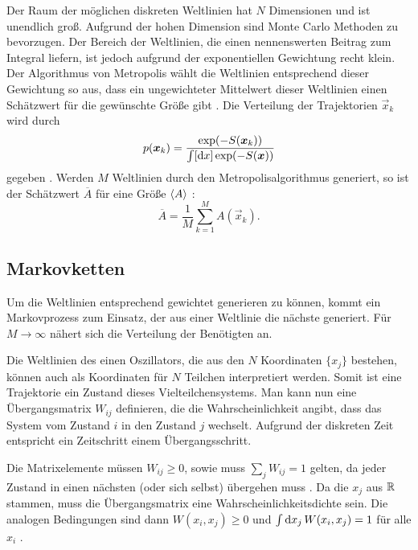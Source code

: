 Der Raum der möglichen diskreten Weltlinien hat $N$ Dimensionen und ist
unendlich groß. Aufgrund der hohen Dimension sind Monte Carlo Methoden zu
bevorzugen. Der Bereich der Weltlinien, die einen nennenswerten Beitrag zum
Integral liefern, ist jedoch aufgrund der exponentiellen Gewichtung recht
klein. Der Algorithmus von Metropolis wählt die Weltlinien entsprechend dieser
Gewichtung so aus, dass ein ungewichteter Mittelwert dieser Weltlinien einen
Schätzwert für die gewünschte Größe gibt
\parencite[434]{Creutz/Statistical_Approach_QM}. Die Verteilung der
Trajektorien $\vec x_k$ wird durch
\begin{equation}
    \label{eq:p_x_k}
    p(\vec x_k) = \frac{\exp(-S(\vec x_k))}{\int [\dif x] \exp(-S(\vec x))}
\end{equation}
gegeben \parencite[(3.6)]{Creutz/Statistical_Approach_QM}. Werden $M$
Weltlinien durch den Metropolisalgorithmus generiert, so ist der Schätzwert
$\overline A$ für
eine Größe $\langle A \rangle$
\parencite[(3.7)]{Creutz/Statistical_Approach_QM}:
\[
    \overline A = \frac1M \sum_{k=1}^M A(\vec x_k).
\]

\subsection{Markovketten}

Um die Weltlinien entsprechend gewichtet generieren zu können, kommt ein
Markovprozess zum Einsatz, der aus einer Weltlinie die nächste generiert. Für
$M \to \infty$ nähert sich die Verteilung der Benötigten an.
\parencite[434]{Creutz/Statistical_Approach_QM}


Die Weltlinien des einen Oszillators, die aus den $N$ Koordinaten $\{x_j\}$
bestehen, können auch als Koordinaten für $N$ Teilchen interpretiert werden.
Somit ist eine Trajektorie ein Zustand dieses Vielteilchensystems. Man kann nun
eine Übergangsmatrix $W_{ij}$ definieren, die die Wahrscheinlichkeit angibt,
dass das System vom Zustand $i$ in den Zustand $j$ wechselt. Aufgrund der
diskreten Zeit entspricht ein Zeitschritt einem Übergangsschritt.

Die Matrixelemente müssen $W_{ij} \geq 0$, sowie muss $\sum_j W_{ij} = 1$
gelten, da jeder Zustand in einen nächsten (oder sich selbst) übergehen muss
\parencite[(3.8)]{Creutz/Statistical_Approach_QM}. Da die $x_j$ aus $\mathbb R$
stammen, muss die Übergangsmatrix eine Wahrscheinlichkeitsdichte sein. Die
analogen Bedingungen sind dann $W(x_i, x_j) \geq 0$ und $\int \dif x_j \,
W(x_i, x_j) = 1$ für alle $x_i$
\parencite[(3.9)]{Creutz/Statistical_Approach_QM}.

